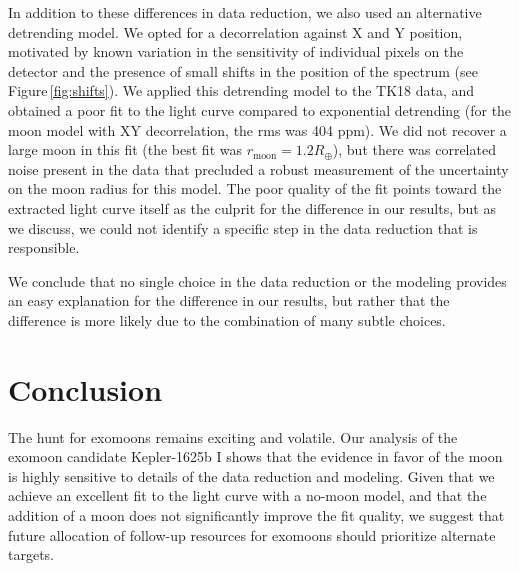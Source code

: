 \documentclass[twocolumn]{aastex62}
\begin{document}
 
In addition to these differences in data reduction, we also used an alternative detrending model. We opted for a decorrelation against X and Y position, motivated by known variation in the sensitivity of individual pixels on the detector and the presence of small shifts in the position of the spectrum (see Figure\,\ref{fig:shifts}). We applied this detrending model to the TK18 data, and obtained a poor fit to the light curve compared to exponential detrending (for the moon model with XY decorrelation, the rms was 404 ppm). We did not recover a large moon in this fit (the best fit was $r_\mathrm{moon} = 1.2R_\oplus$), but there was correlated noise present in the data that precluded a robust measurement of the uncertainty on the moon radius for this model. The poor quality of the fit points toward the extracted light curve itself as the culprit for the difference in our results, but as we discuss, we could not identify a specific step in the data reduction that is responsible.

 We conclude that no single choice in the data reduction or the modeling provides an easy explanation for the difference in our results, but rather that the difference is more likely due to the combination of many subtle choices.

\section{Conclusion}
The hunt for exomoons remains exciting and volatile. Our analysis of the exomoon candidate Kepler-1625b I shows that the evidence in favor of the moon is highly sensitive to details of the data reduction and modeling. Given that we achieve an excellent fit to the light curve with a no-moon model, and that the addition of a moon does not significantly improve the fit quality, we suggest that future allocation of follow-up resources for exomoons should prioritize alternate targets.

\end{document}
